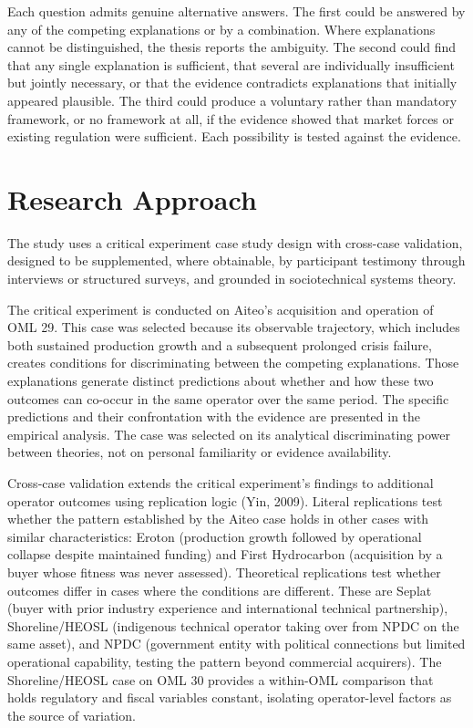\documentclass[twoside,fontset=lmodern]{mitthesis}
\begin{document}
Each question admits genuine alternative answers. The first could be
answered by any of the competing explanations or by a combination. Where
explanations cannot be distinguished, the thesis reports the ambiguity.
The second could find that any single explanation is sufficient, that
several are individually insufficient but jointly necessary, or that the
evidence contradicts explanations that initially appeared plausible. The
third could produce a voluntary rather than mandatory framework, or no
framework at all, if the evidence showed that market forces or existing
regulation were sufficient. Each possibility is tested against the
evidence.

\hypertarget{research-approach}{%
\section{Research Approach}\label{research-approach}}

The study uses a critical experiment case study design with cross-case
validation, designed to be supplemented, where obtainable, by
participant testimony through interviews or structured surveys, and
grounded in sociotechnical systems theory.

The critical experiment is conducted on Aiteo's acquisition and
operation of OML 29. This case was selected because its observable
trajectory, which includes both sustained production growth and a
subsequent prolonged crisis failure, creates conditions for
discriminating between the competing explanations. Those explanations
generate distinct predictions about whether and how these two outcomes
can co-occur in the same operator over the same period. The specific
predictions and their confrontation with the evidence are presented in
the empirical analysis. The case was selected on its analytical
discriminating power between theories, not on personal familiarity or
evidence availability.

Cross-case validation extends the critical experiment's findings to
additional operator outcomes using replication logic (Yin, 2009).
Literal replications test whether the pattern established by the Aiteo
case holds in other cases with similar characteristics: Eroton
(production growth followed by operational collapse despite maintained
funding) and First Hydrocarbon (acquisition by a buyer whose fitness was
never assessed). Theoretical replications test whether outcomes differ
in cases where the conditions are different. These are Seplat (buyer
with prior industry experience and international technical partnership),
Shoreline/HEOSL (indigenous technical operator taking over from NPDC on
the same asset), and NPDC (government entity with political connections
but limited operational capability, testing the pattern beyond
commercial acquirers). The Shoreline/HEOSL case on OML 30 provides a
within-OML comparison that holds regulatory and fiscal variables
constant, isolating operator-level factors as the source of variation.
\end{document}
